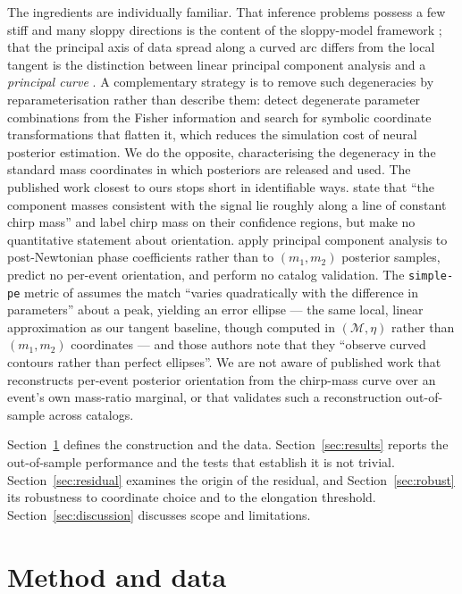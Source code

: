 \documentclass[aps,preprint,amsmath,amssymb,nofootinbib,superscriptaddress]{revtex4-2}
\begin{document}
The ingredients are individually familiar. That inference problems possess a few stiff and many sloppy
directions is the content of the sloppy-model framework \citep{Transtrum2015}; that the principal axis of
data spread along a curved arc differs from the local tangent is the distinction between linear principal
component analysis and a \emph{principal curve} \citep{HastieStuetzle1989}. A complementary strategy is
to remove such degeneracies by reparameterisation rather than describe them: \citet{Makinen2026} detect
degenerate parameter combinations from the Fisher information and search for symbolic coordinate
transformations that flatten it, which reduces the simulation cost of neural posterior estimation. We do
the opposite, characterising the degeneracy in the standard mass coordinates in which posteriors are
released and used. The published work closest to ours stops short in identifiable ways. \citet{Hannam2013} state that ``the component masses consistent with
the signal lie roughly along a line of constant chirp mass'' and label chirp mass on their confidence
regions, but make no quantitative statement about orientation. \citet{Ohme2013} apply principal component
analysis to post-Newtonian phase coefficients rather than to $(m_1,m_2)$ posterior samples, predict no
per-event orientation, and perform no catalog validation. The \texttt{simple-pe} metric of
\citet{Fairhurst2023} assumes the match ``varies quadratically with the difference in parameters'' about a
peak, yielding an error ellipse --- the same local, linear approximation as our tangent baseline, though
computed in $(\mathcal{M},\eta)$ rather than $(m_1,m_2)$ coordinates --- and those authors note that they
``observe curved contours rather than perfect ellipses''. We are not aware of published work that
reconstructs per-event posterior orientation from the chirp-mass curve over an event's own mass-ratio
marginal, or that validates such a reconstruction out-of-sample across catalogs.

Section~\ref{sec:method} defines the construction and the data. Section~\ref{sec:results} reports the
out-of-sample performance and the tests that establish it is not trivial. Section~\ref{sec:residual}
examines the origin of the residual, and Section~\ref{sec:robust} its robustness to coordinate choice and
to the elongation threshold. Section~\ref{sec:discussion} discusses scope and limitations.

\section{Method and data}
\label{sec:method}
\end{document}

